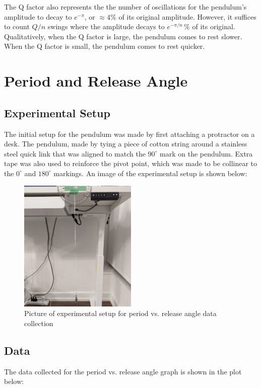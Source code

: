 \documentclass[12pt]{article}
\begin{document}
The Q factor also represents the the number of oscillations for the pendulum's amplitude to decay to $e^{-\pi}$, or $\approx 4\%$ of its original amplitude. {\color{blue}However, it suffices to count $Q/n$ swings where the amplitude decays to $e^{-\pi/n}\,\%$ of its original. Qualitatively, when the Q factor is large, the pendulum comes to rest slower. When the Q factor is small, the pendulum comes to rest quicker.}

\newpage

\section{Period and Release Angle}

\subsection{Experimental Setup}
The initial setup for the pendulum was made by first attaching a protractor on a desk. The pendulum, made by tying a piece of cotton string around a stainless steel quick link {\color{blue} that was aligned to match the $90^{\circ}$ mark on the pendulum. Extra tape was also used to reinforce the pivot point, which was made to be collinear to the $0^{\circ}$ and $180^{\circ}$ markings.} An image of the experimental setup is shown below:

\begin{figure}[!hptb]
    \centering
    \includegraphics[width=0.5\textwidth]{../figures/exp_setup1.jpg}
    \caption{\centering Picture of experimental setup for period vs. release angle data collection}
    \label{fig:figure 1}
\end{figure}

\newpage

\subsection{Data} \label{subsec 3.2 Data}
The data collected for the period vs. release angle graph is shown in the plot below:
\end{document}
